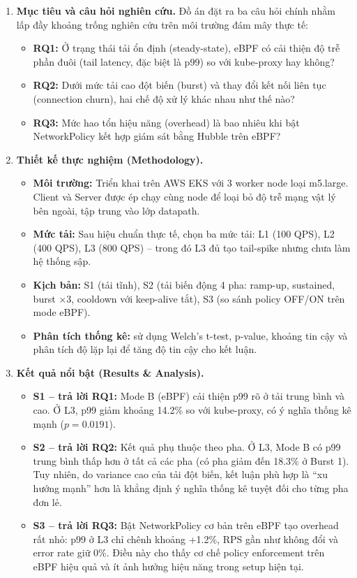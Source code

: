 \begin{enumerate}
\item \textbf{Mục tiêu và câu hỏi nghiên cứu.} Đồ án đặt ra ba câu hỏi chính nhằm lấp đầy khoảng trống nghiên cứu trên môi trường đám mây thực tế:
\begin{itemize}
	\item  \textbf{RQ1: }Ở trạng thái tải ổn định (steady-state), eBPF có cải thiện độ trễ phần đuôi (tail latency, đặc biệt là p99) so với kube-proxy hay không?
	\item  \textbf{RQ2: }Dưới mức tải cao đột biến (burst) và thay đổi kết nối liên tục (connection churn), hai chế độ xử lý khác nhau như thế nào?
	\item  \textbf{RQ3: }Mức hao tổn hiệu năng (overhead) là bao nhiêu khi bật NetworkPolicy kết hợp giám sát bằng Hubble trên eBPF?
\end{itemize}

\item \textbf{Thiết kế thực nghiệm (Methodology).}
\begin{itemize}
	\item \textbf{Môi trường:} Triển khai trên AWS EKS với 3 worker node loại m5.large. Client và Server được ép chạy cùng node để loại bỏ độ trễ mạng vật lý bên ngoài, tập trung vào lớp datapath.
	\item \textbf{Mức tải:} Sau hiệu chuẩn thực tế, chọn ba mức tải: L1 (100 QPS), L2 (400 QPS), L3 (800 QPS) -- trong đó L3 đủ tạo tail-spike nhưng chưa làm hệ thống sập.
	\item \textbf{Kịch bản:} S1 (tải tĩnh), S2 (tải biến động 4 pha: ramp-up, sustained, burst $\times 3$, cooldown với keep-alive tắt), S3 (so sánh policy OFF/ON trên mode eBPF).
	\item \textbf{Phân tích thống kê:} sử dụng Welch's t-test, p-value, khoảng tin cậy và phân tích độ lặp lại để tăng độ tin cậy cho kết luận.
\end{itemize}

\item \textbf{Kết quả nổi bật (Results \& Analysis).}
\begin{itemize}
	\item \textbf{S1 -- trả lời RQ1:} Mode B (eBPF) cải thiện p99 rõ ở tải trung bình và cao. Ở L3, p99 giảm khoảng 14.2\% so với kube-proxy, có ý nghĩa thống kê mạnh ($p=0.0191$).
	\item \textbf{S2 -- trả lời RQ2:} Kết quả phụ thuộc theo pha. Ở L3, Mode B có p99 trung bình thấp hơn ở tất cả các pha (có pha giảm đến 18.3\% ở Burst 1). Tuy nhiên, do variance cao của tải đột biến, kết luận phù hợp là ``xu hướng mạnh'' hơn là khẳng định ý nghĩa thống kê tuyệt đối cho từng pha đơn lẻ.
	\item \textbf{S3 -- trả lời RQ3:} Bật NetworkPolicy cơ bản trên eBPF tạo overhead rất nhỏ: p99 ở L3 chỉ chênh khoảng +1.2\%, RPS gần như không đổi và error rate giữ 0\%. Điều này cho thấy cơ chế policy enforcement trên eBPF hiệu quả và ít ảnh hưởng hiệu năng trong setup hiện tại.
\end{itemize}


\end{enumerate}
